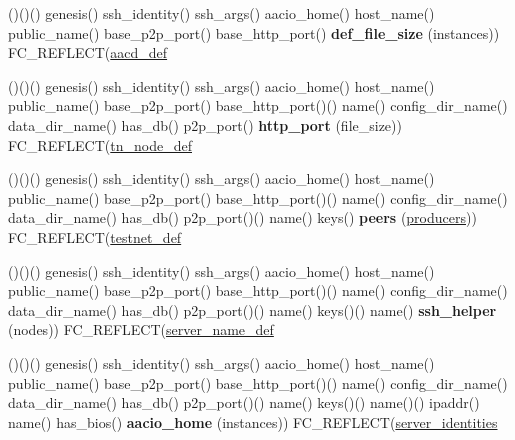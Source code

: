 \begin{DoxyCompactItemize}
\item 
\mbox{\label{programs_2aacio-launcher_2main_8cpp_a17ba6a40215766b4bb4311586e8a0ca1}} 
()()() genesis() ssh\+\_\+identity() ssh\+\_\+args() aacio\+\_\+home() host\+\_\+name() public\+\_\+name() base\+\_\+p2p\+\_\+port() base\+\_\+http\+\_\+port() {\bfseries def\+\_\+file\+\_\+size} (instances)) F\+C\+\_\+\+R\+E\+F\+L\+E\+CT(\mbox{\hyperlink{classaacd__def}{aacd\+\_\+def}}
\item 
\mbox{\label{programs_2aacio-launcher_2main_8cpp_aa4f1d95941a7e8ef6b64ed39cc97fba0}} 
()()() genesis() ssh\+\_\+identity() ssh\+\_\+args() aacio\+\_\+home() host\+\_\+name() public\+\_\+name() base\+\_\+p2p\+\_\+port() base\+\_\+http\+\_\+port()() name() config\+\_\+dir\+\_\+name() data\+\_\+dir\+\_\+name() has\+\_\+db() p2p\+\_\+port() {\bfseries http\+\_\+port} (file\+\_\+size)) F\+C\+\_\+\+R\+E\+F\+L\+E\+CT(\mbox{\hyperlink{classtn__node__def}{tn\+\_\+node\+\_\+def}}
\item 
\mbox{\label{programs_2aacio-launcher_2main_8cpp_aa1ec8b3cbeaff1cf588c07f9812238c5}} 
()()() genesis() ssh\+\_\+identity() ssh\+\_\+args() aacio\+\_\+home() host\+\_\+name() public\+\_\+name() base\+\_\+p2p\+\_\+port() base\+\_\+http\+\_\+port()() name() config\+\_\+dir\+\_\+name() data\+\_\+dir\+\_\+name() has\+\_\+db() p2p\+\_\+port()() name() keys() {\bfseries peers} (\mbox{\hyperlink{structproducers}{producers}})) F\+C\+\_\+\+R\+E\+F\+L\+E\+CT(\mbox{\hyperlink{structtestnet__def}{testnet\+\_\+def}}
\item 
\mbox{\label{programs_2aacio-launcher_2main_8cpp_a4b5bc250babd1aa273428cb49873409e}} 
()()() genesis() ssh\+\_\+identity() ssh\+\_\+args() aacio\+\_\+home() host\+\_\+name() public\+\_\+name() base\+\_\+p2p\+\_\+port() base\+\_\+http\+\_\+port()() name() config\+\_\+dir\+\_\+name() data\+\_\+dir\+\_\+name() has\+\_\+db() p2p\+\_\+port()() name() keys()() name() {\bfseries ssh\+\_\+helper} (nodes)) F\+C\+\_\+\+R\+E\+F\+L\+E\+CT(\mbox{\hyperlink{structserver__name__def}{server\+\_\+name\+\_\+def}}
\item 
\mbox{\label{programs_2aacio-launcher_2main_8cpp_af172f9618b271f293125a142396f3f02}} 
()()() genesis() ssh\+\_\+identity() ssh\+\_\+args() aacio\+\_\+home() host\+\_\+name() public\+\_\+name() base\+\_\+p2p\+\_\+port() base\+\_\+http\+\_\+port()() name() config\+\_\+dir\+\_\+name() data\+\_\+dir\+\_\+name() has\+\_\+db() p2p\+\_\+port()() name() keys()() name()() ipaddr() name() has\+\_\+bios() {\bfseries aacio\+\_\+home} (instances)) F\+C\+\_\+\+R\+E\+F\+L\+E\+CT(\mbox{\hyperlink{structserver__identities}{server\+\_\+identities}}

\end{DoxyCompactItemize}
